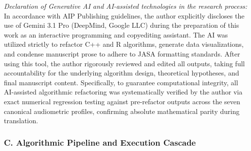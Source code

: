 \documentclass[
  12pt,
]{article}
\begin{document}
\emph{Declaration of Generative AI and AI-assisted technologies in the
research process:} In accordance with AIP Publishing guidelines, the
author explicitly discloses the use of Gemini 3.1 Pro (DeepMind, Google
LLC) during the preparation of this work as an interactive programming
and copyediting assistant. The AI was utilized strictly to refactor C++
and R algorithms, generate data visualizations, and condense manuscript
prose to adhere to JASA formatting standards. After using this tool, the
author rigorously reviewed and edited all outputs, taking full
accountability for the underlying algorithm design, theoretical
hypotheses, and final manuscript content. Specifically, to guarantee
computational integrity, all AI-assisted algorithmic refactoring was
systematically verified by the author via exact numerical regression
testing against pre-refactor outputs across the seven canonical
audiometric profiles, confirming absolute mathematical parity during
translation.

\subsubsection{C. Algorithmic Pipeline and Execution
Cascade}\label{c.-algorithmic-pipeline-and-execution-cascade}
\end{document}
